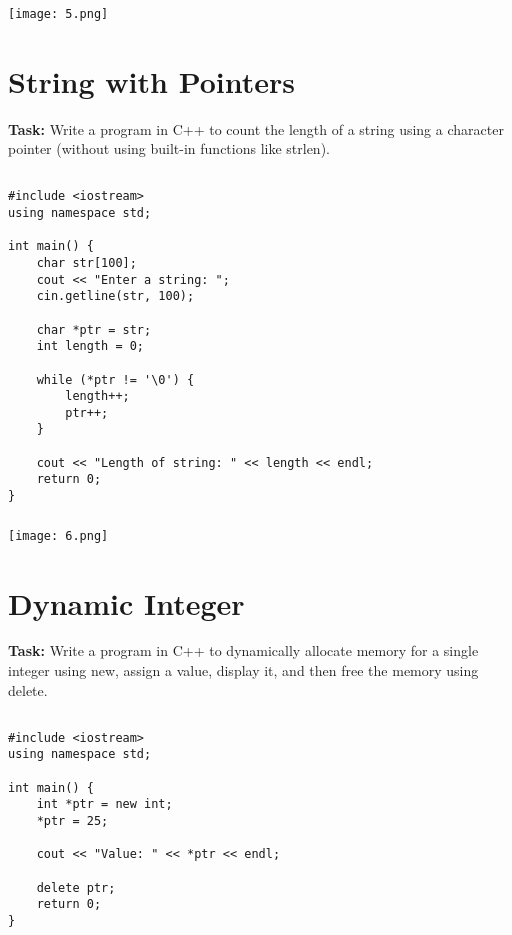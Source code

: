 \documentclass[12pt,a4paper]{article}
\begin{document}
\subsubsection{}
\begin{center}
    \texttt{[image: 5.png]}
\end{center}


\section{String with Pointers }
\textbf{Task:} Write a program in C++ to count the length of a string using a character pointer (without using built-in functions like strlen).

\subsection{}
\begin{lstlisting}
#include <iostream>
using namespace std;

int main() {
    char str[100];
    cout << "Enter a string: ";
    cin.getline(str, 100);

    char *ptr = str;
    int length = 0;

    while (*ptr != '\0') {
        length++;
        ptr++;
    }

    cout << "Length of string: " << length << endl;
    return 0;
}

\end{lstlisting}

\subsubsection{}
\begin{center}
    \texttt{[image: 6.png]}
\end{center}


\section{Dynamic Integer}
\textbf{Task:} Write a program in C++ to dynamically allocate memory for a single integer using new, assign a value, display it, and then free the memory using delete. 

\subsection{}
\begin{lstlisting}
#include <iostream>
using namespace std;

int main() {
    int *ptr = new int;
    *ptr = 25;

    cout << "Value: " << *ptr << endl;

    delete ptr;
    return 0;
}

\end{lstlisting}
\end{document}
